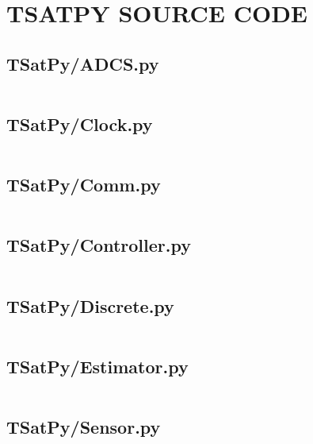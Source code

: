 
\chapter{TSATPY SOURCE CODE}
\label{chap:tsatpy_source}

\linespread{1}

\pagebreak
\section*{TSatPy/ADCS.py}\label{code:TSatPy/ADCS.py}\inputminted[linenos,fontsize=\scriptsize]{python}{/home/dcouture/git/mathyourlife/TSatPy/TSatPy/ADCS.py}

\pagebreak
\section*{TSatPy/Clock.py}\label{code:TSatPy/Clock.py}\inputminted[linenos,fontsize=\scriptsize]{python}{/home/dcouture/git/mathyourlife/TSatPy/TSatPy/Clock.py}

\pagebreak
\section*{TSatPy/Comm.py}\label{code:TSatPy/Comm.py}\inputminted[linenos,fontsize=\scriptsize]{python}{/home/dcouture/git/mathyourlife/TSatPy/TSatPy/Comm.py}

\pagebreak
\section*{TSatPy/Controller.py}\label{code:TSatPy/Controller.py}\inputminted[linenos,fontsize=\scriptsize]{python}{/home/dcouture/git/mathyourlife/TSatPy/TSatPy/Controller.py}

\pagebreak
\section*{TSatPy/Discrete.py}\label{code:TSatPy/Discrete.py}\inputminted[linenos,fontsize=\scriptsize]{python}{/home/dcouture/git/mathyourlife/TSatPy/TSatPy/Discrete.py}

\pagebreak
\section*{TSatPy/Estimator.py}\label{code:TSatPy/Estimator.py}\inputminted[linenos,fontsize=\scriptsize]{python}{/home/dcouture/git/mathyourlife/TSatPy/TSatPy/Estimator.py}

\pagebreak
\section*{TSatPy/Sensor.py}\label{code:TSatPy/Sensor.py}\inputminted[linenos,fontsize=\scriptsize]{python}{/home/dcouture/git/mathyourlife/TSatPy/TSatPy/Sensor.py}

